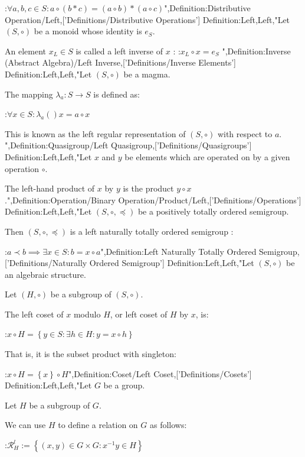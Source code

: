 :$\forall a, b, c \in S: a \circ \left( b * c \right) = \left( a \circ b \right) * \left( a \circ c \right)$",Definition:Distributive Operation/Left,['Definitions/Distributive Operations']
Definition:Left,Left,"Let $\left( S, \circ \right)$ be a monoid whose identity is $e_S$.

An element $x_L \in S$ is called a left inverse of $x$ :
:$x_L \circ x = e_S$
",Definition:Inverse (Abstract Algebra)/Left Inverse,['Definitions/Inverse Elements']
Definition:Left,Left,"Let $\left( S, \circ \right)$ be a magma.

The mapping $\lambda_a: S \to S$ is defined as:

:$\forall x \in S: \lambda_a \left(   \right)x = a \circ x$


This is known as the left regular representation of $\left( S, \circ \right)$ with respect to $a$.
",Definition:Quasigroup/Left Quasigroup,['Definitions/Quasigroups']
Definition:Left,Left,"Let $x$ and $y$ be elements which are operated on by a given operation $\circ$.

The left-hand product of $x$ by $y$ is the product $y \circ x$.",Definition:Operation/Binary Operation/Product/Left,['Definitions/Operations']
Definition:Left,Left,"Let $\left( S, \circ, \preceq \right)$ be a positively totally ordered semigroup.


Then $\left( S, \circ, \preceq \right)$ is a left naturally totally ordered semigroup :

:$a \prec b \implies \exists x \in S: b = x \circ a$",Definition:Left Naturally Totally Ordered Semigroup,['Definitions/Naturally Ordered Semigroup']
Definition:Left,Left,"Let $\left( S, \circ \right)$ be an algebraic structure.

Let $\left( H, \circ \right)$ be a subgroup of $\left( S, \circ \right)$.


The left coset of $x$ modulo $H$, or left coset of $H$ by $x$, is:

:$x \circ H = \left\lbrace y \in S: \exists h \in H: y = x \circ h \right\rbrace$


That is, it is the subset product with singleton:

:$x \circ H = \left\lbrace x \right\rbrace \circ H$",Definition:Coset/Left Coset,['Definitions/Cosets']
Definition:Left,Left,"Let $G$ be a group.

Let $H$ be a subgroup of $G$.


We can use $H$ to define a relation on $G$ as follows:

:$\mathcal R^l_H := \left\lbrace \left( x, y \right) \in G \times G: x^{-1} y \in H \right\rbrace$

